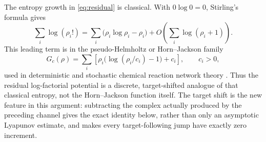 The entropy growth in \eqref{eq:residual} is classical.  With
\(0\log0=0\), Stirling's formula gives
\begin{equation}\label{eq:stirling-entropy}
 \sum_i\log(\rho_i!)
 =\sum_i\bigl(\rho_i\log \rho_i-\rho_i\bigr)
  +O\!\left(\sum_i\log(\rho_i+1)\right).
\end{equation}
This leading term is in the pseudo-Helmholtz or Horn--Jackson family
\[
 G_c(\rho)=\sum_i\left[\rho_i\bigl(\log(\rho_i/c_i)-1\bigr)+c_i\right],
 \qquad c_i>0,
\]
used in deterministic and stochastic chemical reaction network theory
\citep{HornJackson1972,AndersonCraciunGopalkrishnanWiuf2015}.  Thus the residual log-factorial
potential is a discrete, target-shifted analogue of that classical entropy,
not the Horn--Jackson function itself.  The target shift is the new feature in
this argument: subtracting the complex actually produced by the preceding
channel gives the exact identity below, rather than only an asymptotic
Lyapunov estimate, and makes every target-following jump have exactly zero
increment.

